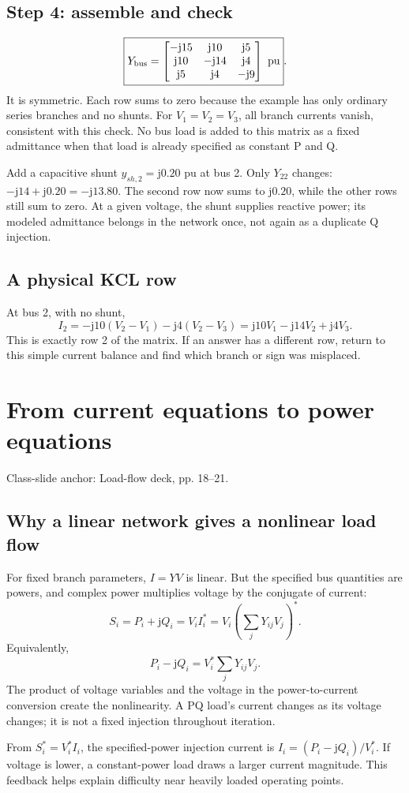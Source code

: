 \documentclass[11pt,a4paper]{article}
\newenvironment{Idea}[1]{\begin{tcolorbox}[colback=pale,colframe=teal,coltitle=white,title={#1}]}{\end{tcolorbox}}
\newenvironment{Worked}[1]{\begin{tcolorbox}[breakable=false,colback=white,colframe=teal,colbacktitle=pale,coltitle=ink,title={#1}]}{\end{tcolorbox}}
\newcommand{\slides}[1]{{\small\color{muted}\textsf{Class-slide anchor: #1.}}\par}
\newcommand{\chapterstart}[2]{\par\needspace{12\baselineskip}\section{#1}\label{#2}}
\newcommand{\jj}{\mathrm j}
\begin{document}
\subsection{Step 4: assemble and check}
\[
\boxed{Y_{\rm bus}=\begin{bmatrix}
-\jj15&\jj10&\jj5\\
\jj10&-\jj14&\jj4\\
\jj5&\jj4&-\jj9
\end{bmatrix}\ \text{pu}}.
\]
It is symmetric. Each row sums to zero because the example has only ordinary series branches and no shunts. For $V_1=V_2=V_3$, all branch currents vanish, consistent with this check. No bus load is added to this matrix as a fixed admittance when that load is already specified as constant P and Q.
\begin{Worked}{An original small modification}
Add a capacitive shunt $y_{sh,2}=\jj0.20$ pu at bus 2. Only $Y_{22}$ changes: $-\jj14+\jj0.20=-\jj13.80$. The second row now sums to $\jj0.20$, while the other rows still sum to zero. At a given voltage, the shunt supplies reactive power; its modeled admittance belongs in the network once, not again as a duplicate Q injection.
\end{Worked}
\subsection{A physical KCL row}
At bus 2, with no shunt,
\[
I_2=-\jj10(V_2-V_1)-\jj4(V_2-V_3)
=\jj10V_1-\jj14V_2+\jj4V_3.
\]
This is exactly row 2 of the matrix. If an answer has a different row, return to this simple current balance and find which branch or sign was misplaced.

\chapterstart{From current equations to power equations}{powereq}
\slides{Load-flow deck, pp. 18--21}
\subsection{Why a linear network gives a nonlinear load flow}
For fixed branch parameters, $I=YV$ is linear. But the specified bus quantities are powers, and complex power multiplies voltage by the conjugate of current:
\[
S_i=P_i+\jj Q_i=V_iI_i^*
=V_i\left(\sum_jY_{ij}V_j\right)^*.
\]
Equivalently,
\[
\boxed{P_i-\jj Q_i=V_i^*\sum_jY_{ij}V_j}.
\]
The product of voltage variables and the voltage in the power-to-current conversion create the nonlinearity. A PQ load's current changes as its voltage changes; it is not a fixed injection throughout iteration.
\begin{Idea}{What the denominator means}
From $S_i^*=V_i^*I_i$, the specified-power injection current is $I_i=(P_i-\jj Q_i)/V_i^*$. If voltage is lower, a constant-power load draws a larger current magnitude. This feedback helps explain difficulty near heavily loaded operating points.
\end{Idea}
\end{document}

